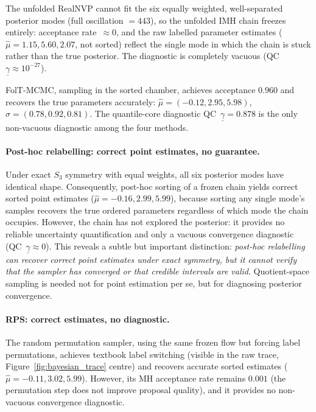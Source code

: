 The unfolded RealNVP cannot fit the six equally weighted,
well-separated posterior modes (full oscillation $= 443$), so the
unfolded IMH chain freezes entirely: acceptance rate~${\approx}0$,
and the raw labelled parameter estimates
($\hat\mu = 1.15, 5.60, 2.07$, not sorted) reflect the single
mode in which the chain is stuck rather than the true posterior.
The diagnostic is completely vacuous
(QC~$\underline{\gamma} \approx 10^{-27}$).

FolT-MCMC, sampling in the sorted chamber, achieves acceptance
$0.960$ and recovers the true parameters accurately:
$\hat\mu = (-0.12, 2.95, 5.98)$,
$\hat\sigma = (0.78, 0.92, 0.81)$.  The quantile-core diagnostic
QC~$\underline{\gamma} = 0.878$ is the only non-vacuous diagnostic
among the four methods.

\paragraph{Post-hoc relabelling: correct point estimates,
no guarantee.}
Under exact $S_3$ symmetry with equal weights, all six posterior
modes have identical shape.  Consequently, post-hoc sorting of a
frozen chain yields correct sorted point estimates
($\hat\mu = -0.16, 2.99, 5.99$), because sorting any single
mode's samples recovers the true ordered parameters regardless of
which mode the chain occupies.  However, the chain has not
explored the posterior: it provides no reliable uncertainty
quantification and only a vacuous convergence diagnostic
(QC~$\underline{\gamma} \approx 0$).
This reveals a subtle but important distinction:
\emph{post-hoc relabelling can recover correct point estimates
under exact symmetry, but it cannot verify that the sampler has
converged or that credible intervals are valid}.
Quotient-space sampling is needed not for point estimation per se,
but for diagnosing posterior convergence.

\paragraph{RPS: correct estimates, no diagnostic.}
The random permutation sampler, using the same frozen flow but
forcing label permutations, achieves textbook label switching
(visible in the raw trace, Figure~\ref{fig:bayesian_trace} centre)
and recovers accurate sorted estimates
($\hat\mu = -0.11, 3.02, 5.99$).
However, its MH acceptance rate remains $0.001$ (the permutation
step does not improve proposal quality), and it provides no
non-vacuous convergence diagnostic.

